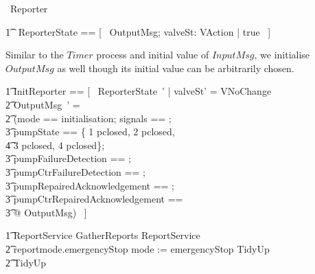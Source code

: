 \documentclass{report} %
\begin{document}
\begin{circus}
    \circprocess\ Reporter \circdef \circbegin \\
\end{circus}
\begin{circusaction}
        \t1 \circstate\ ReporterState == [~ OutputMsg; valveSt: VAction | true ~] \\ %
\end{circusaction}
Similar to the $Timer$ process and initial value of $InputMsg$, we initialise $OutputMsg$ as well though its initial value can be arbitrarily chosen.
\begin{zed}
        \t1 InitReporter == [~ ReporterState~' | valveSt' = VNoChange \land \\
            \t2 \theta OutputMsg~' = \\
            \t2 (\LET mode == initialisation; 
                signals == \emptyset[OutputSignal]; \\
                \t3 pumpState == \{ 1 \mapsto pclosed, 2 \mapsto pclosed, \\
                    \t4 3 \mapsto pclosed, 4 \mapsto pclosed\}; \\
                \t3 pumpFailureDetection == \emptyset[UnitFailure]; \\
                \t3 pumpCtrFailureDetection == \emptyset[UnitFailure]; \\
                \t3 pumpRepairedAcknowledgement == \emptyset[UnitFailure]; \\
                \t3 pumpCtrRepairedAcknowledgement == \emptyset[UnitFailure] \\
                \t3 @ \theta OutputMsg) ~] \\ %
\end{zed}
\begin{circusaction}
        \t1 ReportService \circdef GatherReports \circseq ReportService \extchoice \\ %
            \t2 reportmode.emergencyStop \then mode := emergencyStop \circseq TidyUp \extchoice \\%
            \t2 TidyUp \\
\end{circusaction}
\end{document}
